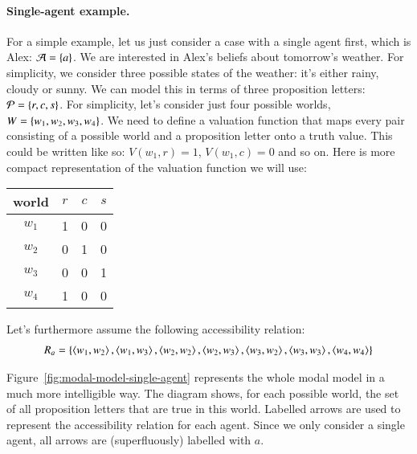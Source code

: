 \documentclass[nobib,nofonts]{tufte-handout}
\begin{document}
\paragraph{Single-agent example.}
For a simple example, let us just consider a case with a single agent first, which is Alex: $\mathcal{A} = \left\{a\right\}$.
We are interested in Alex's beliefs about tomorrow's weather.
For simplicity, we consider three possible states of the weather: it's either rainy, cloudy or sunny.
We can model this in terms of three proposition letters: $\mathcal{P} = \left\{r, c, s\right\}$.
For simplicity, let's consider just four possible worlds, $W = \left\{w_{1}, w_{2}, w_{3}, w_{4}\right\}$.
We need to define a valuation function that maps every pair consisting of a possible world and a proposition letter onto a truth value.
This could be written like so: $V(w_{1},r) = 1$, $V(w_{1},c) = 0$ and so on.
Here is more compact representation of the valuation function we will use:
\begin{center}
  \begin{tabular}{cccc}
    world & $r$ & $c$ & $s$ \\ \hline
    $w_{1}$ & 1 & 0 & 0 \\
    $w_{2}$ & 0 & 1 & 0 \\
    $w_{3}$ & 0 & 0 & 1 \\
    $w_{4}$ & 1 & 0 & 0 \\
  \end{tabular}
\end{center}
Let's furthermore assume the following accessibility relation:
\begin{align*}
  R_{a} = \left\{
  \left \langle w_{1}, w_{2}\right\rangle, \left \langle w_{1}, w_{3}\right\rangle,
  \left \langle w_{2}, w_{2}\right\rangle, \left \langle w_{2}, w_{3}\right\rangle,
  \left \langle w_{3}, w_{2}\right\rangle, \left \langle w_{3}, w_{3}\right\rangle,
  \left \langle w_{4}, w_{4}\right\rangle
  \right\}
\end{align*}

Figure~\ref{fig:modal-model-single-agent} represents the whole modal model in a much more intelligible way.
The diagram shows, for each possible world, the set of all proposition letters that are true in this world.
Labelled arrows are used to represent the accessibility relation for each agent.
Since we only consider a single agent, all arrows are (superfluously) labelled with $a$.
\end{document}
